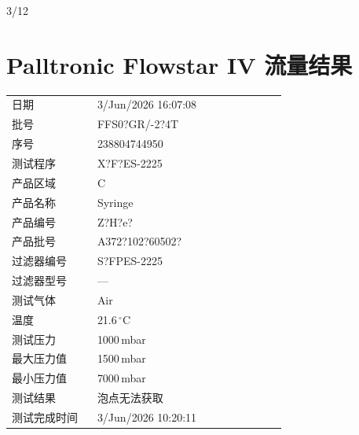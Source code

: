 \documentclass[UTF8,10pt,a4paper,fontset=fandol]{ctexart}
\newcommand{\fieldvalue}[1]{#1}
\newcommand{\handwritten}[1]{#1}
\begin{document}
\handwritten{3/12}

\newpage

\section*{Palltronic Flowstar IV 流量结果}

\begin{tabular}{@{}p{0.28\linewidth}p{0.62\linewidth}@{}}
日期 &
\fieldvalue{3/Jun/2026 16:07:08}
\\[2pt]
批号 &
\fieldvalue{FFS0?GR/-2?4T}
\\[2pt]
序号 &
\fieldvalue{238804744950}
\\[2pt]
测试程序 &
\fieldvalue{X?F?ES-2225}
\\[2pt]
产品区域 &
\fieldvalue{C}
\\[2pt]
产品名称 &
\fieldvalue{Syringe}
\\[2pt]
产品编号 &
\fieldvalue{Z?H?e?}
\\[2pt]
产品批号 &
\fieldvalue{A372?102?60502?}
\\[2pt]
过滤器编号 &
\fieldvalue{S?FPES-2225}
\\[2pt]
过滤器型号 &
\fieldvalue{---}
\\[2pt]
测试气体 &
\fieldvalue{Air}
\\[2pt]
温度 &
\fieldvalue{21.6\,${}^{\circ}$C}
\\[2pt]
测试压力 &
\fieldvalue{1000\,mbar}
\\[2pt]
最大压力值 &
\fieldvalue{1500\,mbar}
\\[2pt]
最小压力值 &
\fieldvalue{7000\,mbar}
\\[2pt]
测试结果 &
\fieldvalue{泡点无法获取}
\\[2pt]
测试完成时间 &
\fieldvalue{3/Jun/2026 10:20:11}
\end{tabular}
\end{document}
